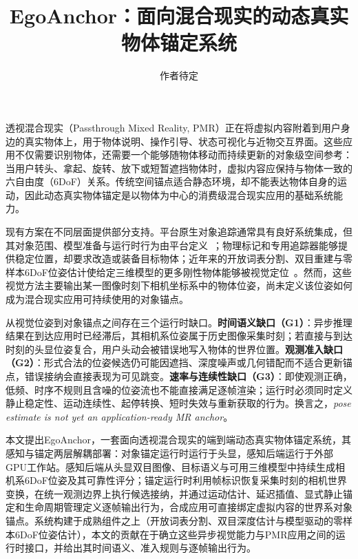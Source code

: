 \documentclass[review]{vgtc}
\title{EgoAnchor：面向混合现实的动态真实物体锚定系统}
\author{作者待定}
\begin{document}
\label{sec:introduction}
\maketitle

透视混合现实（Passthrough Mixed Reality, PMR）正在将虚拟内容附着到用户身边的真实物体上，用于物体说明、操作引导、状态可视化与近物交互界面。这些应用不仅需要识别物体，还需要一个能够随物体移动而持续更新的对象级空间参考：当用户转头、拿起、旋转、放下或短暂遮挡物体时，虚拟内容应保持与物体一致的六自由度（6DoF）关系。传统空间锚点适合静态环境，却不能表达物体自身的运动，因此动态真实物体锚定是以物体为中心的消费级混合现实应用的基础系统能力。

现有方案在不同层面提供部分支持。平台原生对象追踪通常具有良好系统集成，但其对象范围、模型准备与运行时行为由平台定义~\cite{appleObjectAnchor,azureObjectAnchors,metaDynamicObjectTracker}；物理标记和专用追踪器能够提供稳定位置，却要求改造或装备目标物体；近年来的开放词表分割、双目重建与零样本6DoF位姿估计使给定三维模型的更多刚性物体能够被视觉定位~\cite{foundationpose2023,megapose2022}。然而，这些视觉方法主要输出某一图像时刻下相机坐标系中的物体位姿，尚未定义该位姿如何成为混合现实应用可持续使用的对象锚点。

从视觉位姿到对象锚点之间存在三个运行时缺口。\textbf{时间语义缺口（G1）}：异步推理结果在到达应用时已经滞后，其相机系位姿属于历史图像采集时刻；若直接与到达时刻的头显位姿复合，用户头动会被错误地写入物体的世界位置。\textbf{观测准入缺口（G2）}：形式合法的位姿候选仍可能因遮挡、深度噪声或几何错配而不适合更新锚点，错误接纳会直接表现为可见跳变。\textbf{速率与连续性缺口（G3）}：即使观测正确，低频、时序不规则且含噪的位姿流也不能直接满足逐帧渲染；运行时必须同时定义静止稳定性、运动连续性、起停转换、短时失效与重新获取的行为。换言之，\emph{pose estimate is not yet an application-ready MR anchor}。

本文提出EgoAnchor，一套面向透视混合现实的端到端动态真实物体锚定系统，其感知与锚定两层解耦部署：对象锚定运行时运行于头显，感知后端运行于外部GPU工作站。感知后端从头显双目图像、目标语义与可用三维模型中持续生成相机系6DoF位姿及其可靠性评分；锚定运行时利用帧标识恢复采集时刻的相机世界变换，在统一观测边界上执行候选接纳，并通过运动估计、延迟插值、显式静止锚定和生命周期管理定义逐帧输出行为，合成应用可直接绑定虚拟内容的世界系对象锚点。系统构建于成熟组件之上（开放词表分割、双目深度估计与模型驱动的零样本6DoF位姿估计），本文的贡献在于确立这些异步视觉能力与PMR应用之间的运行时接口，并给出其时间语义、准入规则与逐帧输出行为。
\end{document}
